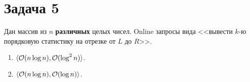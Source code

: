 \section{Задача 5}
Дан массив из $n$ \textbf{различных} целых чисел.
Online запросы вида <<вывести $k$-ю порядковую статистику на отрезке от $L$ до $R$>>.
\begin{enumerate}[label=(\alph*)]
    \item $\langle \mathcal{O}(n \log{n}), \mathcal{O}(\log^2 n) \rangle$.
    \item $\langle \mathcal{O}(n \log{n}), \mathcal{O}(\log n) \rangle$.
\end{enumerate}
